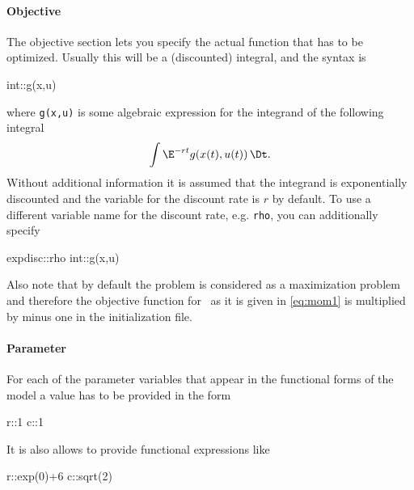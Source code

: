 
\paragraph{Objective}
\label{sec:Objective}
The objective section lets you specify the actual function that has to be optimized. Usually this will be a (discounted) integral, and the syntax is
\begin{ocmlisting}
int::g(x,u)
\end{ocmlisting}
where \lstinline+g(x,u)+ is some algebraic expression for the integrand of the following integral
\begin{equation*}
	\int\E^{-rt}g(x(t),u(t))\,\Dt.
\end{equation*}
Without additional information it is assumed that the integrand is exponentially discounted and the variable for the discount rate is $r$ by default. To use a different variable name for the discount rate, e.g. \lstinline+rho+, you can additionally specify
\begin{ocmlisting}
expdisc::rho
int::g(x,u)
\end{ocmlisting}
Also note that by default the problem is considered as a maximization problem and therefore the objective function for \MoM\ as it is given in \cref{eq:mom1} is multiplied by minus one in the initialization file. %

\paragraph{Parameter}
\label{sec:Parameter}
For each of the parameter variables that appear in the functional forms of the model a value has to be provided in the form
\begin{ocmlisting}
r::1
c::1
\end{ocmlisting}
It is also allows to provide functional expressions like
\begin{ocmlisting}
r::exp(0)+6
c::sqrt(2)
\end{ocmlisting}

